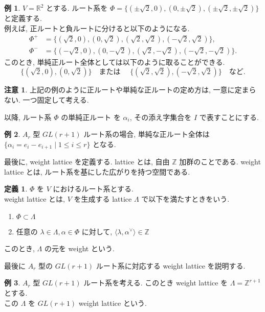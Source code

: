 \documentclass[
  a4paper, 
  12pt,
  ja=standard,
  xelatex,
  left=30truemm,
  right=30truemm,
  titlepage 
]{bxjsarticle}
\theoremstyle{definition}
\newtheorem{df}{定義}[section]
\newtheorem*{ex}{例}
\newtheorem*{re}{注意}
\begin{document}
\begin{ex}
  $V = \mathbb{R}^2$ とする.
  ルート系を $\Phi = \{ (\pm\sqrt{2}, 0), (0, \pm\sqrt{2}), (\pm\sqrt{2}, \pm\sqrt{2}) \}$ と定義する. \\
  例えば, 正ルートと負ルートに分けると以下のようになる.
  \begin{align*}
    \Phi^{+} &= \{ (\sqrt{2}, 0), (0, \sqrt{2}), (\sqrt{2}, \sqrt{2}), (-\sqrt{2}, \sqrt{2}) \}, \\
    \Phi^{-} &= \{ (-\sqrt{2}, 0), (0, -\sqrt{2}), (\sqrt{2}, -\sqrt{2}), (-\sqrt{2}, -\sqrt{2}) \}.
  \end{align*}
  このとき, 単純正ルート全体としては以下のように取ることができる.
  \[
    \{ (\sqrt{2}, 0), (0, \sqrt{2}) \} \quad \text{または } \quad \{ (\sqrt{2}, \sqrt{2}), (-\sqrt{2}, \sqrt{2}) \} \quad \text{など.}
  \]
\end{ex}


\begin{re}
  上記の例のように正ルートや単純な正ルートの定め方は, 一意に定まらない. 一つ固定して考える.

  以降, ルート系 $\Phi$ の単純正ルート を $\alpha_i$, その添え字集合を $I$ で表すことにする.
\end{re}

\begin{ex}
  $A_r$ 型 $GL(r+1)$ ルート系の場合, 単純な正ルート全体は $ \{ \alpha_i = e_i - e_{i+1} \mid 1 \leq i \leq r \}$ となる.
\end{ex}

最後に, weight lattice を定義する.
lattice とは, 自由 $\mathbb{Z}$ 加群のことである.
weight lattice とは, ルート系を基にした広がりを持つ空間である.

\begin{df}
  $\Phi$ を $V$ におけるルート系とする. \\
  weight lattice とは, $V$ を生成する lattice $\Lambda$ で以下を満たすときをいう.
  \begin{enumerate}
    \item $\Phi \subset \Lambda $
    \item 任意の $ \lambda \in \Lambda, \alpha \in \Phi $ に対して, $ \langle \lambda, \alpha^{ \vee } \rangle \in \mathbb{Z} $
  \end{enumerate}
  このとき, $\Lambda$ の元を weight という.
\end{df}

最後に $A_r$ 型の $GL(r + 1)$ ルート系に対応する weight lattice を説明する.

\begin{ex}
  $A_r$ 型 $GL(r + 1)$ ルート系を考える.
  このとき weight lattice を $\Lambda = \mathbb{Z}^{r+1}$ とする. \\
  この $\Lambda$ を $GL(r + 1)$ weight lattice という.
\end{ex}
\end{document}

